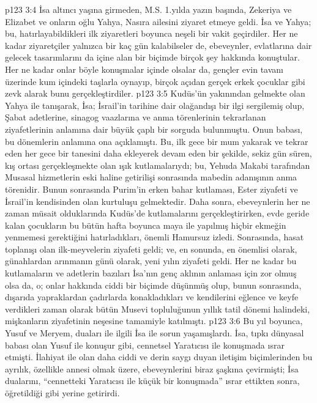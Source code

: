 \vs p123 3:4 İsa altıncı yaşına girmeden, M.S. 1.yılda yazın başında, Zekeriya ve Elizabet ve onların oğlu Yahya, Nasıra ailesini ziyaret etmeye geldi. İsa ve Yahya; bu, hatırlayabildikleri ilk ziyaretleri boyunca neşeli bir vakit geçirdiler. Her ne kadar ziyaretçiler yalnızca bir kaç gün kalabilseler de, ebeveynler, evlatlarına dair gelecek tasarımlarını da içine alan bir biçimde birçok şey hakkında konuştular. Her ne kadar onlar böyle konuşmalar içinde olsalar da, gençler evin tavanı üzerinde kum içindeki taşlarla oynayıp, birçok açıdan gerçek erkek çocuklar gibi zevk alarak bunu gerçekleştirdiler.
\vs p123 3:5 Kudüs’ün yakınından gelmekte olan Yahya ile tanışarak, İsa; İsrail’in tarihine dair olağandışı bir ilgi sergilemiş olup, Şabat adetlerine, sinagog vaazlarına ve anma törenlerinin tekrarlanan ziyafetlerinin anlamına dair büyük çaplı bir sorguda bulunmuştu. Onun babası, bu dönemlerin anlamına ona açıklamıştı. Bu, ilk gece bir mum yakarak ve tekrar eden her gece bir tanesini daha ekleyerek devam eden bir şekilde, sekiz gün süren, kış ortası gerçekleşmekte olan ışık kutlamalarıydı; bu, Yehuda Makabi tarafından Musasal hizmetlerin eski haline getirilişi sonrasında mabedin adanışının anma törenidir. Bunun sonrasında Purim’in erken bahar kutlaması, Ester ziyafeti ve İsrail’in kendisinden olan kurtuluşu gelmektedir. Daha sonra, ebeveynlerin her ne zaman müsait olduklarında Kudüs’de kutlamalarını gerçekleştirirken, evde geride kalan çocukların bu bütün hafta boyunca maya ile yapılmış hiçbir ekmeğin yenmemesi gerektiğini hatırladıkları, önemli Hamursuz izledi. Sonrasında, hasat toplanışı olan ilk\hyp{}meyvelerin ziyafeti geldi; ve, en sonunda, en önemlisi olarak, günahlardan arınmanın günü olarak, yeni yılın ziyafeti geldi. Her ne kadar bu kutlamaların ve adetlerin bazıları İsa’nın genç aklının anlaması için zor olmuş olsa da, o; onlar hakkında ciddi bir biçimde düşünmüş olup, bunun sonrasında, dışarıda yapraklardan çadırlarda konakladıkları ve kendilerini eğlence ve keyfe verdikleri zaman olarak bütün Musevi topluluğunun yıllık tatil dönemi halindeki, mişkanların ziyafetinin neşesine tamamiyle katılmıştı.
\vs p123 3:6 Bu yıl boyunca, Yusuf ve Meryem, duaları ile ilgili İsa ile sorun yaşamışlardı. İsa, tıpkı dünyasal babası olan Yusuf ile konuşur gibi, cennetsel Yaratıcısı ile konuşmada ısrar etmişti. İlahiyat ile olan daha ciddi ve derin saygı duyan iletişim biçimlerinden bu ayrılık, özellikle annesi olmak üzere, ebeveynlerini biraz şaşkına çevirmişti; İsa dualarını, “cennetteki Yaratıcısı ile küçük bir konuşmada” ısrar ettikten sonra, öğretildiği gibi yerine getirirdi.
